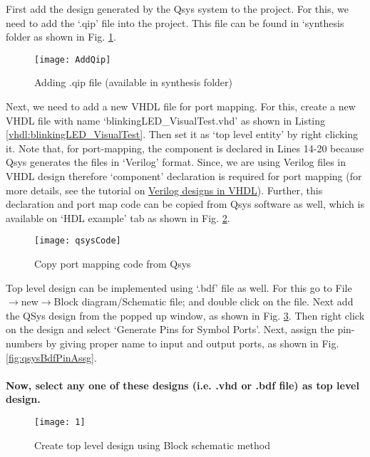 First add the design generated by the Qsys system to the project. For this, we need to add the `.qip' file into the project. This file can be found in `synthesis folder as shown in Fig. \ref{fig:AddQip}. 

  \begin{figure}[!h]
  	\centering
  	\texttt{[image: AddQip]}
  	\caption{Adding .qip file (available in synthesis folder)}
  	\label{fig:AddQip}
  \end{figure}

Next, we need to add a new VHDL file for port mapping. For this, create a new VHDL file with name `blinkingLED\_VisualTest.vhd' as shown in Listing \ref{vhdl:blinkingLED_VisualTest}. Then set it as `top level entity' by right clicking it. Note that, for port-mapping, the component is declared in Lines 14-20 because Qsys generates the files in `Verilog' format. Since, we are using Verilog files in VHDL design therefore `component' declaration is required for port mapping (for more details, see the tutorial on \href{http://pythondsp.blogspot.com/2016/10/chapter-6-verilog-designs-in-vhdl.html}{Verilog designs in VHDL}). Further, this declaration and port map code can be copied from Qsys software as well, which is available on `HDL example' tab as shown in Fig. \ref{fig:qsysVHDLCode}.

  \begin{figure}[!h]
  	\centering
  	\texttt{[image: qsysCode]}
  	\caption{Copy port mapping code from Qsys}
  	\label{fig:qsysVHDLCode}
  \end{figure}

Top level design can be implemented using `.bdf' file as well. For this go to File$\rightarrow$new$\rightarrow$Block diagram/Schematic file; and double click on the file. Next add the QSys design from the popped up window, as shown in Fig. \ref{fig:qsysBdfCode}. Then right click on the design and select `Generate Pins for Symbol Ports'. Next, assign the pin-numbers by giving proper name to input and output ports, as shown in Fig. \ref{fig:qsysBdfPinAssg}. 
\\
\\
\textbf{Now, select any one of these designs (i.e. .vhd or .bdf file) as top level design. }

\begin{figure}
	\centering
	\texttt{[image: 1]}
	\caption{Create top level design using Block schematic method}
	\label{fig:qsysBdfCode}
\end{figure}

